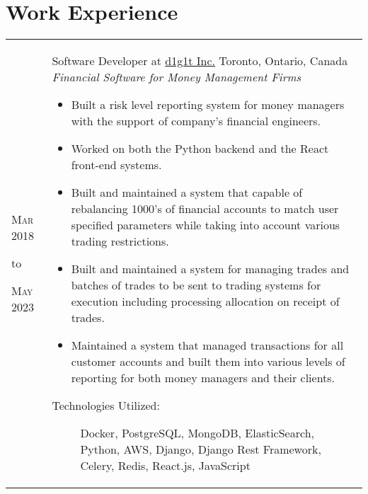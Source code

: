 \documentclass[a4paper,10pt]{article}
\begin{document}
        \section{Work Experience}
        \begin{tabular}{ R{1.5cm} | p{10.5cm} }
            \hfill \textsc{Mar 2018}\newline
            \begin{center} to \end{center}
            \hfill \textsc{May 2023} &

            Software Developer at \href{https://www.d1g1t.com/}{d1g1t Inc.}\newline
            Toronto, Ontario, Canada\newline
            \emph{Financial Software for Money Management Firms} \newline
            \fontsize{9pt}{10pt}\selectfont
            \begin{itemize}
                \item Built a risk level reporting system for money managers with the support of company's financial engineers.
                \item Worked on both the Python backend and the React front-end systems.
                \item Built and maintained a system that capable of rebalancing 1000's of financial accounts to match user specified parameters while taking into account various trading restrictions.
                \item Built and maintained a system for managing trades and batches of trades to be sent to trading systems for execution including processing allocation on receipt of trades.
                \item Maintained a system that managed transactions for all customer accounts and built them into various levels of reporting for both money managers and their clients.
            \end{itemize}
            \bigskip
            \begin{description}
                \item[Technologies Utilized:]
                    Docker, PostgreSQL, MongoDB, ElasticSearch, Python, AWS,
                    Django, Django Rest Framework, Celery, Redis, React.js,
                    JavaScript
            \end{description}
        \end{tabular}
\end{document}
